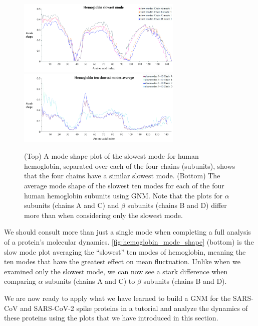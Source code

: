 \begin{figure}[h]
	\centering
	\mySfFamily
	\includegraphics[width = 0.7\textwidth]{../images_CMYK/hemoglobin_slowest_mode_edited}\\[3ex]
	\includegraphics[width = 0.7\textwidth]{../images_CMYK/hemoglobin_mode_shape_avg_edited}
	\caption{(Top) A mode shape plot of the slowest mode for human hemoglobin, separated over each of the four chains (subunits), shows that the four chains have a similar slowest mode. (Bottom) The average mode shape of the slowest ten modes for each of the four human hemoglobin subunits using GNM. Note that the plots for $\alpha$ subunits (chains A and C) and $\beta$ subunits (chains B and D) differ more than when considering only the slowest mode.}
	\label{fig:hemoglobin_mode_shape}
\end{figure}

We should consult more than just a single mode when completing a full analysis of a protein's molecular dynamics. \autoref{fig:hemoglobin_mode_shape} (bottom) is the slow mode plot averaging the ``slowest'' ten modes of hemoglobin, meaning the ten modes that have the greatest effect on mean fluctuation. Unlike when we examined only the slowest mode, we can now see a stark difference when comparing $\alpha$ subunits (chains A and C) to $\beta$ subunits (chains B and D).

We are now ready to apply what we have learned  to build a GNM for the SARS-CoV and SARS-CoV-2 spike proteins in a tutorial and analyze the dynamics of these proteins using the plots that we have introduced in this section.

\FloatBarrier
{}

